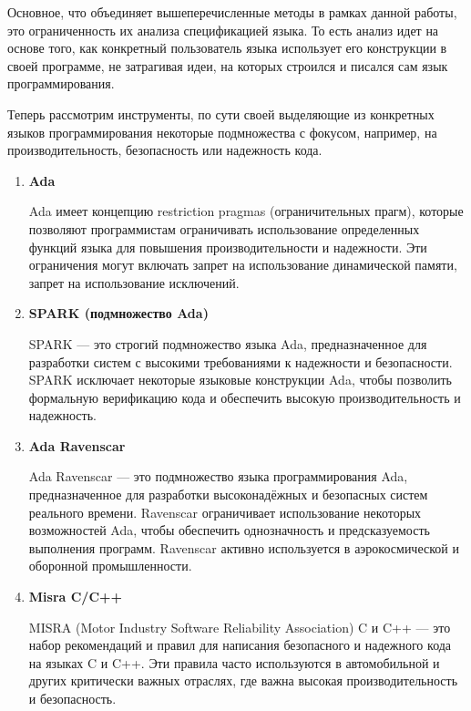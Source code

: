 \documentclass{mipt-thesis-bs}
\begin{document}
Основное, что объединяет вышеперечисленные методы в рамках данной работы, это ограниченность их
анализа спецификацией языка. То есть анализ идет на основе того, как конкретный пользователь
языка использует его конструкции в своей программе, не затрагивая идеи, на которых строился
и писался сам язык программирования.

Теперь рассмотрим инструменты, по сути своей выделяющие из конкретных языков программирования
некоторые подмножества с фокусом, например, на производительность, безопасность или надежность кода.

\begin{enumerate}
        \item \textbf{Ada}

        Ada имеет концепцию restriction pragmas (ограничительных прагм), которые позволяют
        программистам ограничивать использование определенных функций языка для повышения
        производительности и надежности. Эти ограничения могут включать запрет на использование
        динамической памяти, запрет на использование исключений.

        \item \textbf{SPARK (подмножество Ada)}

        SPARK — это строгий подмножество языка Ada, предназначенное для разработки
        систем с высокими требованиями к надежности и безопасности. SPARK исключает некоторые
        языковые конструкции Ada, чтобы позволить формальную верификацию кода и
        обеспечить высокую производительность и надежность.

        \item \textbf{Ada Ravenscar}

        Ada Ravenscar — это подмножество языка программирования Ada, предназначенное для
        разработки высоконадёжных и безопасных систем реального времени. Ravenscar ограничивает
        использование некоторых возможностей Ada, чтобы обеспечить однозначность и
        предсказуемость выполнения программ. Ravenscar активно используется в аэрокосмической и оборонной промышленности.

        \item \textbf{Misra C/C++}

        MISRA (Motor Industry Software Reliability Association) C и C++ — это набор
        рекомендаций и правил для написания безопасного и надежного кода на
        языках C и C++. Эти правила часто используются в автомобильной и
        других критически важных отраслях, где важна высокая производительность и безопасность.


\end{enumerate}
\end{document}
